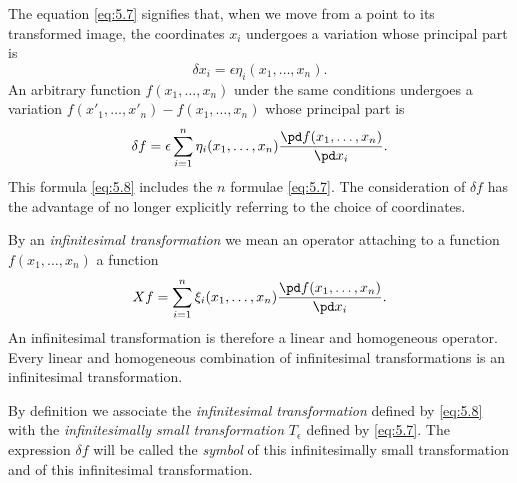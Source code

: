 The equation \eqref{eq:5.7} signifies that, when we move from a point to its transformed image, the coordinates $x_{i}$ undergoes a variation whose principal part is
\[
\delta x_{i}=\epsilon\eta_{i}(x_{1},\dots,x_{n}).
\]
An arbitrary function $f(x_{1},\dots,x_{n})$ under the same conditions undergoes a variation $f(x'_{1},\dots,x'_{n})-f(x_{1},\dots,x_{n})$ whose principal part is
\begin{equation}
  \label{eq:5.8}
  \delta f=\epsilon\sum_{i=1}^{n}\eta_{i}(x_{1},\dots,x_{n})\frac{\pd f(x_{1},\dots,x_{n})}{\pd x_{i}}.
\end{equation}
This formula \eqref{eq:5.8} includes the $n$ formulae \eqref{eq:5.7}. The consideration of $\delta f$ has the advantage of no longer explicitly referring to the choice of coordinates.

By an \emph{infinitesimal transformation} we mean an operator attaching to a function $f(x_{1},\dots,x_{n})$ a function
\[
Xf=\sum_{i=1}^{n}\xi_{i}(x_{1},\dots,x_{n})\frac{\pd f(x_{1},\dots,x_{n})}{\pd x_{i}}.
\]
An infinitesimal transformation is therefore a linear and homogeneous operator. Every linear and homogeneous combination of infinitesimal transformations is an infinitesimal transformation.

By definition we associate the \emph{infinitesimal transformation} defined by \eqref{eq:5.8} with the \emph{infinitesimally small transformation} $T_{\epsilon}$ defined by \eqref{eq:5.7}. The expression $\delta f$ will be called the \emph{symbol} of this infinitesimally small transformation and of this infinitesimal transformation.

\somespace


